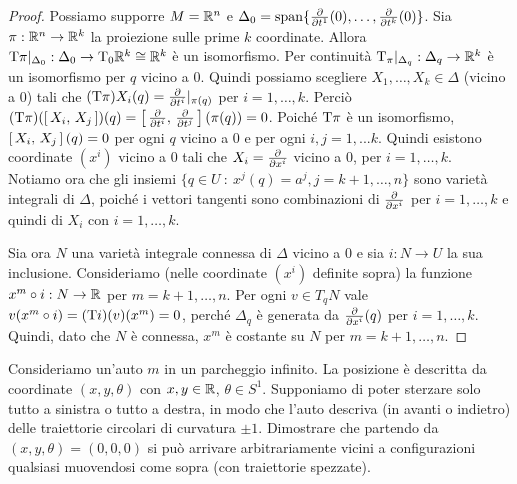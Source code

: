 \begin{proof}
	Possiamo supporre $M=\mathbb R^n$ e $\Delta_0=\mathrm{span}\{\frac{\partial }{\partial t^1}(0),\ldots,\frac{\partial }{\partial t^k}(0)\}$. Sia $\pi:\mathbb R^n\to\mathbb R^k$ la proiezione sulle prime $k$ coordinate. Allora $\mathrm T\pi|_{\Delta_0}:\Delta_0\to \mathrm T_0\mathbb R^k\cong \mathbb R^k$ è un isomorfismo.
	Per continuità $\mathrm T_\pi|_{\Delta_q}:\Delta_q\to\mathbb R^k $ è un isomorfismo per $q$ vicino a 0.
	Quindi possiamo scegliere $X_1,\ldots,X_k\in\Delta$ (vicino a 0) tali che $(\mathrm T\pi)X_i(q) = \frac{\partial }{\partial t^i}|_{\pi(q)}$ per $i=1,\ldots, k$.
	Perciò $(\mathrm T\pi)(\left[\,X_i,\,X_j\,\right])(q) = \left[\,\frac{\partial }{\partial t^i},\,\frac{\partial }{\partial t^j}\,\right](\pi(q))=0$.
	Poiché $\mathrm T\pi$ è un isomorfismo, $\left[\,X_i,\,X_j\,\right](q)=0$ per ogni $q$ vicino a 0 e per ogni $i,j=1,...k$.
	Quindi esistono coordinate $(x^i)$ vicino a 0 tali che $X_i = \frac{\partial }{\partial x^i}$ vicino a 0, per $i=1,\ldots,k$. \\
	Notiamo ora che gli insiemi $\{q\in U\ : \ x^j(q)=a^j, j=k+1,\ldots,n\}$ sono varietà integrali di $\Delta$, poiché i vettori tangenti sono combinazioni di $\frac{\partial }{\partial x^i}$ per $i=1,\ldots,k$ e quindi di $X_i$ con $i=1,\ldots,k$.
	
	Sia ora $N$ una varietà integrale connessa di $\Delta$ vicino a 0 e sia $i:N\to U$ la sua inclusione. Consideriamo (nelle coordinate $(x^i)$ definite sopra) la funzione $x^m\circ i:N\to \mathbb R$ per $m=k+1,\ldots,n$. Per ogni $v\in T_qN$ vale $v(x^m\circ i) = (\mathrm T i)(v)(x^m)=0$, perché $\Delta_q$ è generata da $\frac{\partial }{\partial x^i}(q)$ per $i=1,\ldots,k$. Quindi, dato che $N$ è connessa, $x^m$ è costante su $N$ per $m=k+1,\ldots,n$.
\end{proof}

\begin{exercise} [Parcheggio]
	Consideriamo un'auto $m$ in un parcheggio infinito. La posizione è descritta da coordinate $(x,y,\theta)$ con $x,y\in\mathbb R$, $\theta\in S^1$.
	Supponiamo di poter sterzare solo tutto a sinistra o tutto a destra, in modo che l'auto descriva (in avanti o indietro) delle traiettorie circolari di curvatura $\pm 1$.
	Dimostrare che partendo da $(x,y,\theta)=(0,0,0)$ si può arrivare arbitrariamente vicini a configurazioni qualsiasi muovendosi come sopra (con traiettorie spezzate).
\end{exercise}



